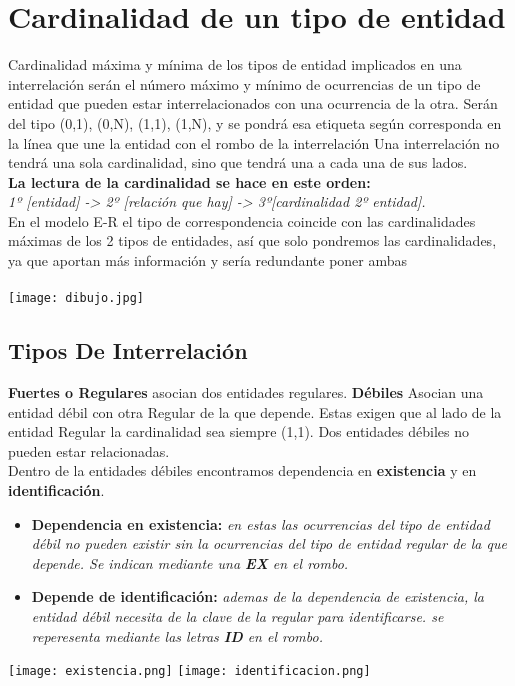 \documentclass{article}
\begin{document}
\section{Cardinalidad de un tipo de entidad}
Cardinalidad máxima y mínima de los tipos de entidad implicados en una interrelación serán el número máximo y mínimo de ocurrencias de un tipo de entidad que pueden estar interrelacionados con una 
ocurrencia de la otra. Serán del tipo (0,1), (0,N), (1,1), (1,N), y se pondrá esa etiqueta según corresponda en la línea que une la entidad con el rombo de la interrelación Una interrelación no 
tendrá una sola cardinalidad, sino que tendrá una a cada una de sus lados.
\\
\textbf{La lectura de la cardinalidad se hace en este orden:}\\
\textit{1º [entidad] -> 2º [relación que hay] -> 3º[cardinalidad 2º entidad].}
\\
En el modelo E-R el tipo de correspondencia coincide con las cardinalidades máximas de los 2 tipos de entidades, así que solo pondremos las cardinalidades, ya que aportan más información y sería 
redundante poner ambas
\\
\\
\texttt{[image: dibujo.jpg]}

\newpage
\subsection{Tipos De Interrelación}
\textbf{Fuertes o Regulares} asocian dos entidades regulares.
\textbf{Débiles} Asocian una entidad débil con otra Regular de la que depende. Estas exigen que al lado de la entidad Regular la cardinalidad sea siempre (1,1). Dos entidades débiles no pueden estar 
relacionadas.
\\
Dentro de la entidades débiles encontramos dependencia en \textbf{existencia} y en \textbf{identificación}.
\begin{itemize}
    \item \textbf{Dependencia en existencia:} \textit{en estas las ocurrencias del tipo de entidad débil no pueden existir sin la ocurrencias del tipo de entidad regular de la que depende. Se indican 
    mediante una \textbf{EX} en el rombo.}
    \item \textbf{Depende de identificación:} \textit{ademas de la dependencia de existencia, la entidad débil necesita de la clave de la regular
    para identificarse. se reperesenta mediante las letras \textbf{ID} en el rombo.}
\end{itemize}
\texttt{[image: existencia.png]}
\texttt{[image: identificacion.png]}
\end{document}

